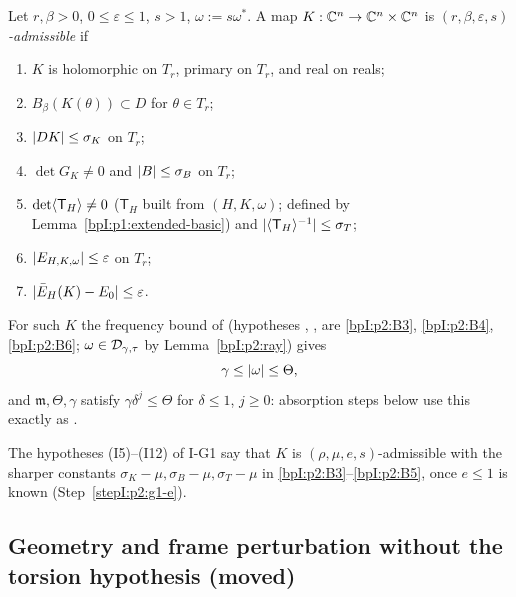 \begin{definition}\label{bpI:p2:admissible}
Let $r,\beta>0$, $0\le\varepsilon\le1$, $s>1$, $\omega:=s\omega^*$. A map $K:\mathbb{C}^n\to\mathbb{C}^n\times\mathbb{C}^n$ is
\emph{$(r,\beta,\varepsilon,s)$-admissible} if
\begin{enumerate}[label=(B\arabic*)]
\item\label{bpI:p2:B1} $K$ is holomorphic on $T_r$, primary on $T_r$, and real on reals;
\item\label{bpI:p2:B2} $B_\beta(K(\theta))\subset D$ for $\theta\in T_r$;
\item\label{bpI:p2:B3} $\lvert DK\rvert\le\sigma_K$ on $T_r$;
\item\label{bpI:p2:B4} $\det G_K\ne0$ and $\lvert B\rvert\le\sigma_B$ on $T_r$;
\item\label{bpI:p2:B5} $\det\langle \mathsf T_H\rangle\ne0$ ($\mathsf T_H$ built from $(H,K,\omega)$; defined by Lemma~\ref{bpI:p1:extended-basic}) and $\lvert \langle \mathsf T_H\rangle^{-1}\rvert\le\sigma_T$;
\item\label{bpI:p2:B6} $\lvert E_{H,K,\omega}\rvert\le\varepsilon$ on $T_r$;
\item\label{bpI:p2:B7} $\lvert \bar E_H(K)-E_0\rvert\le\varepsilon$.
\end{enumerate}
For such $K$ the frequency bound of  (hypotheses , ,  are \ref{bpI:p2:B3},
\ref{bpI:p2:B4}, \ref{bpI:p2:B6}; $\omega\in\mathcal{D}_{\gamma,\tau}$ by Lemma~\ref{bpI:p2:ray}) gives
\begin{equation}\label{bpI:p2:freq}
\gamma\le\lvert \omega\rvert\le\Theta,
\end{equation}
and $\mathfrak m,\Theta,\gamma$ satisfy $\gamma\delta^j\le\Theta$ for $\delta\le1$, $j\ge0$: absorption steps below use this exactly as
.
\end{definition}

The hypotheses (I5)--(I12) of I-G1 say that $K$ is $(\rho,\mu,e,s)$-admissible with the sharper constants
$\sigma_K-\mu,\sigma_B-\mu,\sigma_T-\mu$ in \ref{bpI:p2:B3}--\ref{bpI:p2:B5}, once $e\le1$ is known (Step~\ref{stepI:p2:g1-e}).

\subsection{Geometry and frame perturbation without the torsion hypothesis (moved)}\label{bpI:p2:sec-geometry}

